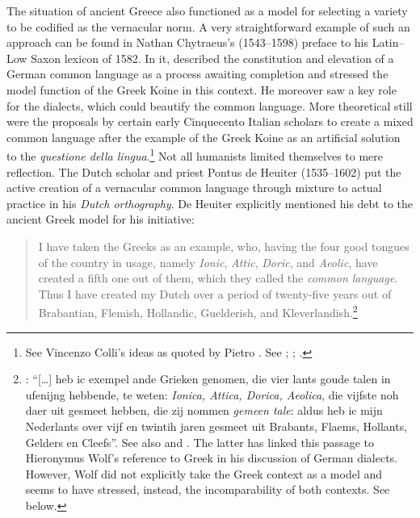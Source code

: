 The situation of ancient Greece also functioned as a model for selecting a variety to be codified as the vernacular norm. A very straightforward example of such an approach can be found in Nathan Chytraeus’s (1543–1598) preface to his Latin–Low Saxon lexicon of 1582. In it, \citet[\textsc{a.3}\textsc{\textsuperscript{r}}\textsc{–a.3}\textsc{\textsuperscript{v}}]{Chytraeus1582} described the constitution and elevation of a German common language as a process awaiting completion and stressed the model function of the Greek Koine in this context. He moreover saw a key role for the dialects, which could beautify the common language. More theoretical still were the proposals by certain early Cinquecento Italian scholars to create a mixed common language after the example of the Greek Koine as an artificial solution to the \textit{questione della lingua}.\footnote{See Vincenzo Colli’s ideas as quoted by Pietro \citet[\textsc{xii}\textsc{\textsuperscript{v}}\textsc{–xiii}\textsc{\textsuperscript{r}}]{Bembo1525}. See \citet[119]{Melzi1966}; \citet[215--218]{Trovato1984}; \citet[12]{Trapp1990}.} Not all humanists limited themselves to mere reflection. The Dutch scholar and priest Pontus de Heuiter (1535–1602) put the active creation of a vernacular common language through mixture to actual practice in his \textit{Dutch orthography}. De Heuiter explicitly mentioned his debt to the ancient Greek model for his initiative:

\begin{quote}
I have taken the Greeks as an example, who, having the four good tongues of the country in usage, namely \textit{Ionic}, \textit{Attic}, \textit{Doric}, and \textit{Aeolic}, have created a fifth one out of them, which they called the \textit{common language}. Thus I have created my Dutch over a period of twenty-five years out of Brabantian, Flemish, Hollandic, Guelderish, and Kleverlandish.\footnote{: “[…] heb ic exempel ande Grieken genomen, die vier lants goude talen in ufenijng hebbende, te weten: \textit{Ionica, Attica, Dorica, Aeolica}, die vijfste noh daer uit gesmeet hebben, die zij nommen \textit{gemeen tale}: aldus heb ic mijn Nederlants over vijf en twintih jaren gesmeet uit Brabants, Flaems, Hollants, Gelders en Cleefs”. See also \citet[110]{Dibbets2008} and . The latter has linked this passage to Hieronymus Wolf’s reference to Greek in his discussion of German dialects. However, Wolf did not explicitly take the Greek context as a model and seems to have stressed, instead, the incomparability of both contexts. See  below.}
\end{quote}

